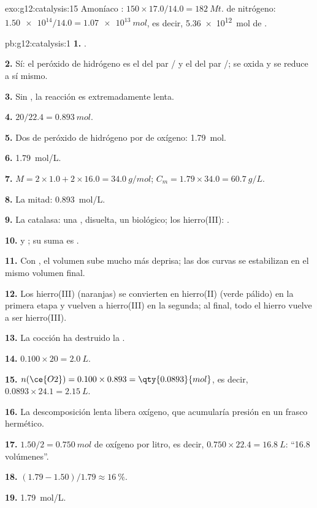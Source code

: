 \begin{solution}{exo:g12:catalysis:15}
Amoníaco : $150 \times 17.0 / 14.0 = \qty{182}{Mt}$.  de
nitrógeno: $\num{1.50e14} / 14.0 = \qty{1.07e13}{mol}$, es decir,
\qty{5.36e12}{mol} de .
\end{solution}

\begin{solution}{pb:g12:catalysis:1}
\textbf{1.} .

\textbf{2.} Sí: el peróxido de hidrógeno es el  del par
/ y el  del par /; se oxida y se
reduce a sí mismo.

\textbf{3.} Sin , la reacción es extremadamente lenta.

\textbf{4.} $20 / 22.4 = \qty{0.893}{mol}$.

\textbf{5.} Dos  de peróxido de hidrógeno por  de oxígeno:
\qty{1.79}{mol}.

\textbf{6.} \qty{1.79}{mol/L}.

\textbf{7.} $M = 2 \times 1.0 + 2 \times 16.0 = \qty{34.0}{g/mol}$;
$C_m = 1.79 \times 34.0 = \qty{60.7}{g/L}$.

\textbf{8.} La mitad: \qty{0.893}{mol/L}.

\textbf{9.} La catalasa: una , disuelta, un  biológico;
los  hierro(III): .

\textbf{10.}  y
; su suma es
.

\textbf{11.} Con , el volumen sube mucho más deprisa; las dos
curvas se estabilizan en el mismo volumen final.

\textbf{12.} Los  hierro(III) (naranjas) se convierten en
hierro(II) (verde pálido) en la primera etapa y vuelven a hierro(III) en
la segunda; al final, todo el hierro vuelve a ser hierro(III).

\textbf{13.} La cocción ha destruido la .

\textbf{14.} $0.100 \times 20 = \qty{2.0}{L}$.

\textbf{15.} $n(\ce{O2}) = 0.100 \times 0.893 = \qty{0.0893}{mol}$, es
decir, $0.0893 \times 24.1 = \qty{2.15}{L}$.

\textbf{16.} La descomposición lenta libera oxígeno, que acumularía
presión en un frasco hermético.

\textbf{17.} $1.50 / 2 = \qty{0.750}{mol}$ de oxígeno por litro, es
decir, $0.750 \times 22.4 = \qty{16.8}{L}$: ``16.8 volúmenes''.

\textbf{18.} $(1.79 - 1.50)/1.79 \approx \qty{16}{\percent}$.

\textbf{19.} \qty{1.79}{mol/L}.
\end{solution}
